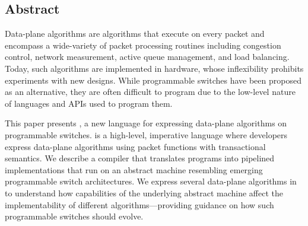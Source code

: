 \subsection*{Abstract}

Data-plane algorithms are algorithms that execute on every packet and encompass
a wide-variety of packet processing routines including congestion control,
network measurement, active queue management, and load balancing. Today, such
algorithms are implemented in hardware, whose inflexibility prohibits
experiments with new designs. While programmable switches have been proposed as
an alternative, they are often difficult to program due to the low-level nature
of languages and APIs used to program them.

This paper presents \pktlanguage, a new language for expressing data-plane
algorithms on programmable switches. \pktlanguage is a high-level, imperative
language where developers express data-plane algorithms using packet functions
with transactional semantics. We describe a compiler that translates
\pktlanguage programs into pipelined implementations that run on an abstract
machine resembling emerging programmable switch architectures. We express
several data-plane algorithms in \pktlanguage to understand how capabilities of
the underlying abstract machine affect the implementability of different
algorithms---providing guidance on how such programmable switches should
evolve.

